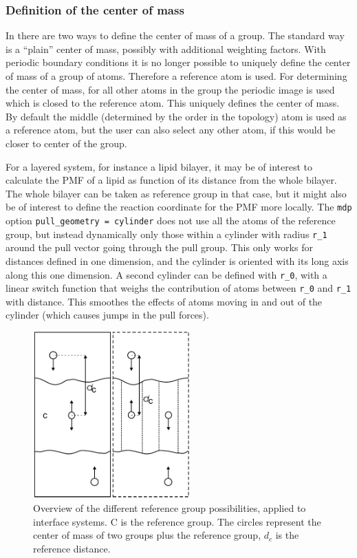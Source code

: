 \subsubsection{Definition of the center of mass}

In {\gromacs} there are two ways to define the center of mass of a group.
The standard way is a ``plain'' center of mass, possibly with additional
weighting factors. With periodic boundary conditions it is no longer
possible to uniquely define the center of mass of a group of atoms.
Therefore a reference atom is used. For determining the center of mass,
for all other atoms in the group the periodic image is used which is
closed to the reference atom. This uniquely defines the center of mass.
By default the middle (determined by the order in the topology) atom
is used as a reference atom, but the user can also select any other atom,
if this would be closer to center of the group.

For a layered system, for instance a lipid bilayer, it may be of interest
to calculate the PMF of a lipid as function of its distance
from the whole bilayer. The whole bilayer can be taken as reference
group in that case, but it might also be of interest to define the
reaction coordinate for the PMF more locally. The {\tt mdp} option
{\tt pull\_geometry = cylinder} does not
use all the atoms of the reference group, but instead dynamically only those
within a cylinder with radius {\tt r\_1} around the pull vector going
through the pull group. This only
works for distances defined in one dimension, and the cylinder is
oriented with its long axis along this one dimension. A second cylinder
can be defined with {\tt r\_0}, with a linear switch function that weighs
the contribution of atoms between {\tt r\_0} and {\tt r\_1} with
distance. This smoothes the effects of atoms moving in and out of the
cylinder (which causes jumps in the pull forces).

\begin{figure}
\centerline{\includegraphics[width=6cm]{plots/pullref}}
\caption{Overview of the different reference group possibilities,
applied to interface systems. C is the reference group. The circles
represent the center of mass of two groups plus the reference group,
$d_c$ is the reference distance.}
\label{fi:pullref} 
\end{figure}   

